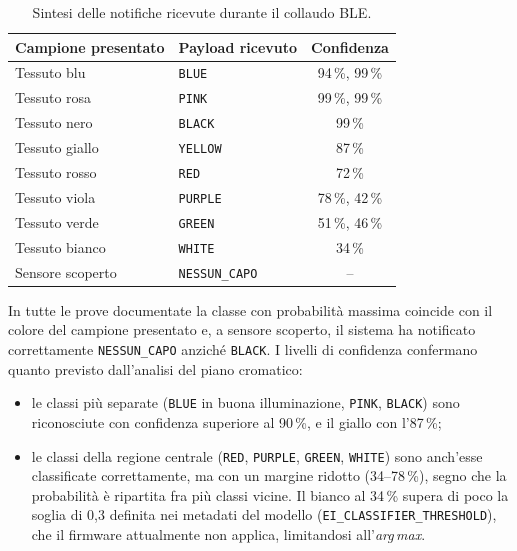 \documentclass[11pt,a4paper,twoside,openany]{report}
\begin{document}
\begin{table}[htbp]
\centering
\caption{Sintesi delle notifiche ricevute durante il collaudo BLE.}
\label{tab:collaudo}
\begin{tabular}{@{}llc@{}}
\toprule
\textbf{Campione presentato} & \textbf{Payload ricevuto} & \textbf{Confidenza} \\
\midrule
Tessuto blu        & \texttt{BLUE}         & 94\,\%, 99\,\% \\
Tessuto rosa       & \texttt{PINK}         & 99\,\%, 99\,\% \\
Tessuto nero       & \texttt{BLACK}        & 99\,\% \\
Tessuto giallo     & \texttt{YELLOW}       & 87\,\% \\
Tessuto rosso      & \texttt{RED}          & 72\,\% \\
Tessuto viola      & \texttt{PURPLE}       & 78\,\%, 42\,\% \\
Tessuto verde      & \texttt{GREEN}        & 51\,\%, 46\,\% \\
Tessuto bianco     & \texttt{WHITE}        & 34\,\% \\
Sensore scoperto   & \texttt{NESSUN\_CAPO} & -- \\
\bottomrule
\end{tabular}
\end{table}

In tutte le prove documentate la classe con probabilità massima
coincide con il colore del campione presentato e, a sensore scoperto,
il sistema ha notificato correttamente \texttt{NESSUN\_CAPO} anziché
\texttt{BLACK}. I livelli di confidenza confermano quanto previsto
dall'analisi del piano cromatico:

\begin{itemize}
  \item le classi più separate (\texttt{BLUE} in buona illuminazione,
        \texttt{PINK}, \texttt{BLACK}) sono riconosciute con confidenza
        superiore al 90\,\%, e il giallo con l'87\,\%;
  \item le classi della regione centrale (\texttt{RED},
        \texttt{PURPLE}, \texttt{GREEN}, \texttt{WHITE}) sono anch'esse
        classificate correttamente, ma con un margine ridotto
        (34--78\,\%), segno che la probabilità è ripartita fra più
        classi vicine. Il bianco al 34\,\% supera di poco la soglia di
        0,3 definita nei metadati del modello
        (\texttt{EI\_CLASSIFIER\_THRESHOLD}), che il firmware
        attualmente non applica, limitandosi all'\textit{arg\,max}.
\end{itemize}
\end{document}
